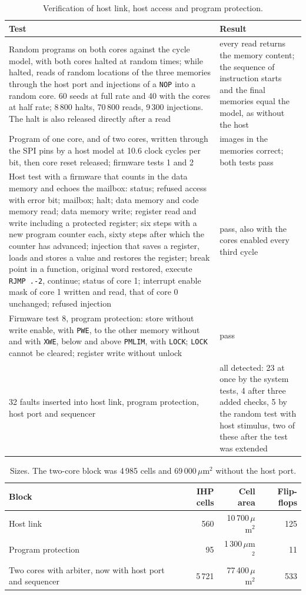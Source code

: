\documentclass[10pt,a4paper]{article}
\newcommand{\reg}[1]{\texttt{#1}}
\begin{document}
\begin{table}[H]
\centering\small
\begin{tabularx}{\linewidth}{@{}LL@{}}
\toprule
Test & Result \\
\midrule
Random programs on both cores against the cycle model, with both cores halted at random times; while halted, reads of random locations of the three memories through the host port and injections of a \texttt{NOP} into a random core. 60 seeds at full rate and 40 with the cores at half rate; 8\,800 halts, 70\,800 reads, 9\,300 injections. The halt is also released directly after a read & every read returns the memory content; the sequence of instruction starts and the final memories equal the model, as without the host \\
Program of one core, and of two cores, written through the SPI pins by a host model at 10.6 clock cycles per bit, then core reset released; firmware tests 1 and 2 & images in the memories correct; both tests pass \\
Host test with a firmware that counts in the data memory and echoes the mailbox: status; refused access with error bit; mailbox; halt; data memory and code memory read; data memory write; register read and write including a protected register; six steps with a new program counter each, sixty steps after which the counter has advanced; injection that saves a register, loads and stores a value and restores the register; break point in a function, original word restored, execute \texttt{RJMP .-2}, continue; status of core 1; interrupt enable mask of core 1 written and read, that of core 0 unchanged; refused injection & pass, also with the cores enabled every third cycle \\
Firmware test 8, program protection: store without write enable, with \reg{PWE}, to the other memory without and with \reg{XWE}, below and above \reg{PMLIM}, with \reg{LOCK}; \reg{LOCK} cannot be cleared; register write without unlock & pass \\
32 faults inserted into host link, program protection, host port and sequencer & all detected: 23 at once by the system tests, 4 after three added checks, 5 by the random test with host stimulus, two of these after the test was extended \\
\bottomrule
\end{tabularx}
\caption{Verification of host link, host access and program protection.}
\end{table}

\begin{table}[H]
\centering\small
\begin{tabular}{@{}lrrr@{}}
\toprule
Block & IHP cells & Cell area & Flip-flops \\
\midrule
Host link & 560 & 10\,700\,$\mu$m$^2$ & 125 \\
Program protection & 95 & 1\,300\,$\mu$m$^2$ & 11 \\
Two cores with arbiter, now with host port and sequencer & 5\,721 & 77\,400\,$\mu$m$^2$ & 533 \\
\bottomrule
\end{tabular}
\caption{Sizes. The two-core block was 4\,985 cells and 69\,000\,$\mu$m$^2$ without the host port.}
\end{table}
\end{document}
